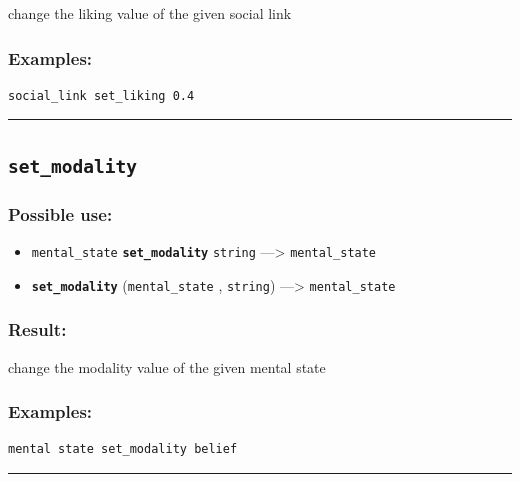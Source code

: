 \documentclass[]{book}
\providecommand{\tightlist}{%
  \setlength{\itemsep}{0pt}\setlength{\parskip}{0pt}}
\theoremstyle{definition}
\theoremstyle{definition}
\theoremstyle{definition}
\theoremstyle{remark}
\begin{document}
change the liking value of the given social link

\subsubsection{Examples:}\label{examples-319}

\begin{verbatim}
social_link set_liking 0.4 
\end{verbatim}

\begin{center}\rule{0.5\linewidth}{\linethickness}\end{center}

\subsection{\texorpdfstring{\texttt{set\_modality}}{set\_modality}}\label{set_modality}

\subsubsection{Possible use:}\label{possible-use-463}

\begin{itemize}
\tightlist
\item
  \texttt{mental\_state} \textbf{\texttt{set\_modality}} \texttt{string}
  ---\textgreater{} \texttt{mental\_state}
\item
  \textbf{\texttt{set\_modality}} (\texttt{mental\_state} ,
  \texttt{string}) ---\textgreater{} \texttt{mental\_state}
\end{itemize}

\subsubsection{Result:}\label{result-447}

change the modality value of the given mental state

\subsubsection{Examples:}\label{examples-320}

\begin{verbatim}
mental state set_modality belief 
\end{verbatim}

\begin{center}\rule{0.5\linewidth}{\linethickness}\end{center}
\end{document}
